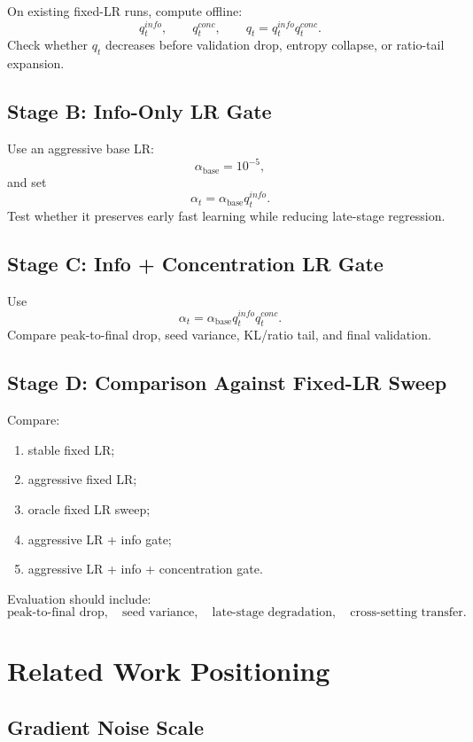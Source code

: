 \documentclass[11pt,a4paper]{article}
\begin{document}
On existing fixed-LR runs, compute offline:
\[
q_t^{info},\qquad q_t^{conc},\qquad q_t=q_t^{info}q_t^{conc}.
\]
Check whether \(q_t\) decreases before validation drop, entropy collapse, or ratio-tail expansion.

\subsection{Stage B: Info-Only LR Gate}

Use an aggressive base LR:
\[
\alpha_{\mathrm{base}}=10^{-5},
\]
and set
\[
\alpha_t=\alpha_{\mathrm{base}}q_t^{info}.
\]
Test whether it preserves early fast learning while reducing late-stage regression.

\subsection{Stage C: Info + Concentration LR Gate}

Use
\[
\alpha_t=\alpha_{\mathrm{base}}q_t^{info}q_t^{conc}.
\]
Compare peak-to-final drop, seed variance, KL/ratio tail, and final validation.

\subsection{Stage D: Comparison Against Fixed-LR Sweep}

Compare:
\begin{enumerate}[leftmargin=2em]
    \item stable fixed LR;
    \item aggressive fixed LR;
    \item oracle fixed LR sweep;
    \item aggressive LR + info gate;
    \item aggressive LR + info + concentration gate.
\end{enumerate}

Evaluation should include:
\[
\text{peak-to-final drop},\quad
\text{seed variance},\quad
\text{late-stage degradation},\quad
\text{cross-setting transfer}.
\]

\section{Related Work Positioning}

\subsection{Gradient Noise Scale}
\end{document}
